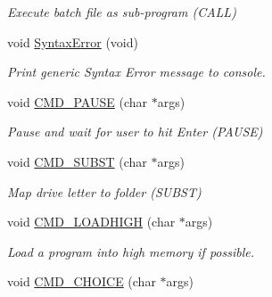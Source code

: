 \begin{DoxyCompactItemize}
\begin{DoxyCompactList}\small\item\em Execute batch file as sub-\/program (C\-A\-L\-L) \end{DoxyCompactList}\item 
\hypertarget{classDOS__Shell_aac7d57d83c368abf38cd7fb16ae36807}{void \hyperlink{classDOS__Shell_aac7d57d83c368abf38cd7fb16ae36807}{Syntax\-Error} (void)}\label{classDOS__Shell_aac7d57d83c368abf38cd7fb16ae36807}

\begin{DoxyCompactList}\small\item\em Print generic Syntax Error message to console. \end{DoxyCompactList}\item 
\hypertarget{classDOS__Shell_a2734250cf37333fa861f38903742fab9}{void \hyperlink{classDOS__Shell_a2734250cf37333fa861f38903742fab9}{C\-M\-D\-\_\-\-P\-A\-U\-S\-E} (char $\ast$args)}\label{classDOS__Shell_a2734250cf37333fa861f38903742fab9}

\begin{DoxyCompactList}\small\item\em Pause and wait for user to hit Enter (P\-A\-U\-S\-E) \end{DoxyCompactList}\item 
\hypertarget{classDOS__Shell_a065ef1b041d6b1fd6e9c9df105d2d287}{void \hyperlink{classDOS__Shell_a065ef1b041d6b1fd6e9c9df105d2d287}{C\-M\-D\-\_\-\-S\-U\-B\-S\-T} (char $\ast$args)}\label{classDOS__Shell_a065ef1b041d6b1fd6e9c9df105d2d287}

\begin{DoxyCompactList}\small\item\em Map drive letter to folder (S\-U\-B\-S\-T) \end{DoxyCompactList}\item 
\hypertarget{classDOS__Shell_a579342df494d3257531fcabcc424b614}{void \hyperlink{classDOS__Shell_a579342df494d3257531fcabcc424b614}{C\-M\-D\-\_\-\-L\-O\-A\-D\-H\-I\-G\-H} (char $\ast$args)}\label{classDOS__Shell_a579342df494d3257531fcabcc424b614}

\begin{DoxyCompactList}\small\item\em Load a program into high memory if possible. \end{DoxyCompactList}\item 
\hypertarget{classDOS__Shell_a497ed2a6a4077d25f96bdd19a414287d}{void \hyperlink{classDOS__Shell_a497ed2a6a4077d25f96bdd19a414287d}{C\-M\-D\-\_\-\-C\-H\-O\-I\-C\-E} (char $\ast$args)}\label{classDOS__Shell_a497ed2a6a4077d25f96bdd19a414287d}


\end{DoxyCompactItemize}

